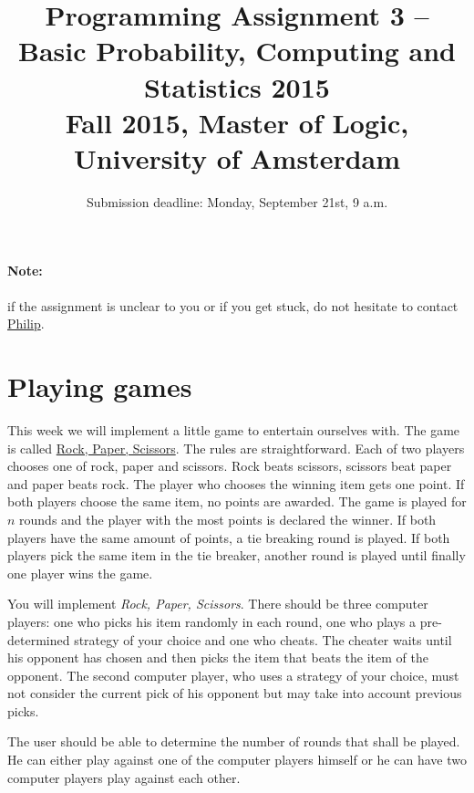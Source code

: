 \documentclass[11pt, leqno, a4paper]{article}
\title{Programming Assignment 3 -- Basic Probability, Computing and Statistics 2015 \\[2mm]
\large{Fall 2015, Master of Logic, University of Amsterdam}}
\author{}
\date{Submission deadline: Monday, September 21st, 9 a.m.}
\begin{document}
\maketitle

\paragraph{Note:} if the assignment is unclear to you or if you get stuck, do not hesitate to contact \href{mailto:P.Schulz@uva.nl}{Philip}.

\section{Playing games}\label{intro}
This week we will implement a little game to entertain ourselves with. The game is called \href{https://en.wikipedia.org/wiki/Rock-paper-scissors}{Rock, Paper, Scissors}. 
The rules are straightforward.
Each of two players chooses one of rock, paper and scissors. Rock beats scissors, scissors beat paper and paper beats rock. The player who chooses the winning
item gets one point. If both players choose the same item, no points are awarded. The game is played for $ n $ rounds and the player with the most points
is declared the winner. If both players have the same amount of points, a tie breaking round is played. If both players pick the same item in the tie breaker,
another round is played until finally one player wins the game.

You will implement \textit{Rock, Paper, Scissors}. There should be three computer players: one who picks his item randomly in each round, one who plays a 
pre-determined strategy of your choice and one who cheats. The cheater waits until his opponent has chosen and then picks the item that beats the item of the
opponent. The second computer player, who uses a strategy of your choice, must not consider the current pick of his opponent but may take into account previous picks.

The user should be able to determine the number of rounds that shall be played. He can either play against one of the computer players himself or he can have two
computer players play against each other.
\end{document}
